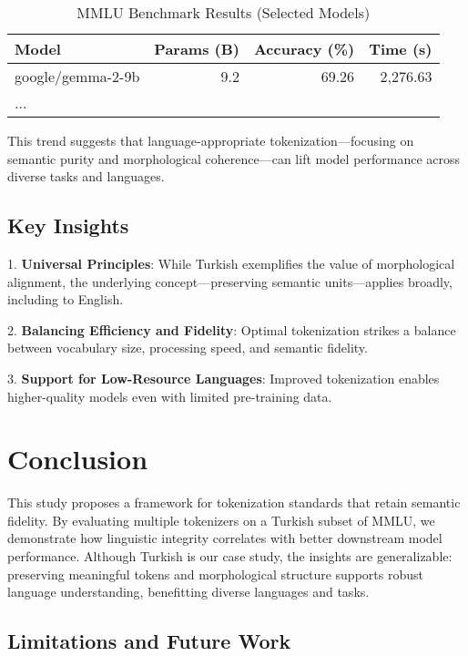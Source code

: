   \begin{table}[h]
  \centering
  \caption{MMLU Benchmark Results (Selected Models)}
  \label{tab:mmlu-results}
  \begin{tabular}{|l|r|r|r|}
  \hline
  \textbf{Model} & \textbf{Params (B)} & \textbf{Accuracy (\%)} & \textbf{Time (s)} \\ \hline
  google/gemma-2-9b & 9.2 & 69.26 & 2,276.63 \\ \hline
  ... & & & \\ \hline
  \end{tabular}
  \end{table}
  
  This trend suggests that language-appropriate tokenization—focusing on semantic purity and morphological coherence—can lift model performance across diverse tasks and languages.
  
  \subsection{Key Insights}
  
  1. \textbf{Universal Principles}: While Turkish exemplifies the value of morphological alignment, the underlying concept—preserving semantic units—applies broadly, including to English.  
  
  2. \textbf{Balancing Efficiency and Fidelity}: Optimal tokenization strikes a balance between vocabulary size, processing speed, and semantic fidelity.  
  
  3. \textbf{Support for Low-Resource Languages}: Improved tokenization enables higher-quality models even with limited pre-training data.
  
  \section{Conclusion}
  
  This study proposes a framework for tokenization standards that retain semantic fidelity. By evaluating multiple tokenizers on a Turkish subset of MMLU, we demonstrate how linguistic integrity correlates with better downstream model performance. Although Turkish is our case study, the insights are generalizable: preserving meaningful tokens and morphological structure supports robust language understanding, benefitting diverse languages and tasks.
  
  \subsection{Limitations and Future Work}
  
